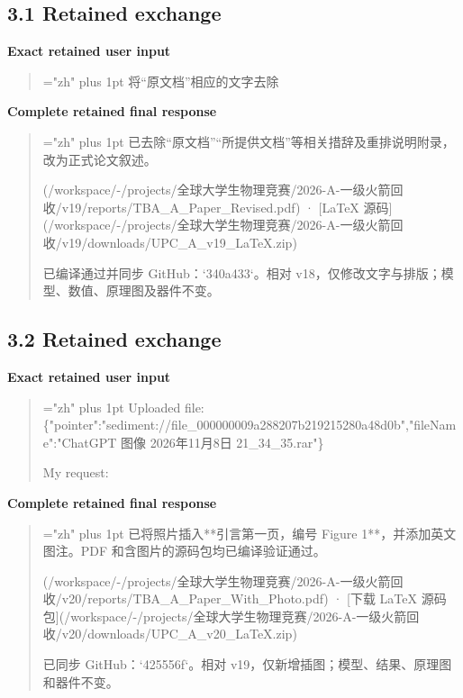 \subsection*{3.1 Retained exchange}
\noindent\textbf{Exact retained user input}
\begin{quote}\begingroup\sloppy\emergencystretch=\linewidth\zhfont\small\XeTeXlinebreaklocale "zh"\XeTeXlinebreakskip=0pt plus 1pt
将“原文档”相应的文字去除
\endgroup\end{quote}
\noindent\textbf{Complete retained final response}
\begin{quote}\begingroup\sloppy\emergencystretch=\linewidth\zhfont\small\XeTeXlinebreaklocale "zh"\XeTeXlinebreakskip=0pt plus 1pt
已去除“原文档”“所提供文档”等相关措辞及重排说明附录，改为正式论文叙述。
\par
[修订论文 PDF](/workspace/-/projects/全球大学生物理竞赛/2026-A-一级火箭回收/v19/reports/TBA\_A\_Paper\_Revised.pdf) · [LaTeX 源码](/workspace/-/projects/全球大学生物理竞赛/2026-A-一级火箭回收/v19/downloads/UPC\_A\_v19\_LaTeX.zip)
\par
已编译通过并同步 GitHub：`340a433`。相对 v18，仅修改文字与排版；模型、数值、原理图及器件不变。
\endgroup\end{quote}
\subsection*{3.2 Retained exchange}
\noindent\textbf{Exact retained user input}
\begin{quote}\begingroup\sloppy\emergencystretch=\linewidth\zhfont\small\XeTeXlinebreaklocale "zh"\XeTeXlinebreakskip=0pt plus 1pt
Uploaded file: \{"pointer":"sediment://file\_000000009a288207b219215280a48d0b","fileName":"ChatGPT 图像 2026年11月8日 21\_34\_35.rar"\}
\par
My request:
\endgroup\end{quote}
\noindent\textbf{Complete retained final response}
\begin{quote}\begingroup\sloppy\emergencystretch=\linewidth\zhfont\small\XeTeXlinebreaklocale "zh"\XeTeXlinebreakskip=0pt plus 1pt
已将照片插入**引言第一页，编号 Figure 1**，并添加英文图注。PDF 和含图片的源码包均已编译验证通过。
\par
[下载论文 PDF](/workspace/-/projects/全球大学生物理竞赛/2026-A-一级火箭回收/v20/reports/TBA\_A\_Paper\_With\_Photo.pdf) · [下载 LaTeX 源码包](/workspace/-/projects/全球大学生物理竞赛/2026-A-一级火箭回收/v20/downloads/UPC\_A\_v20\_LaTeX.zip)
\par
已同步 GitHub：`425556f`。相对 v19，仅新增插图；模型、结果、原理图和器件不变。
\endgroup\end{quote}
